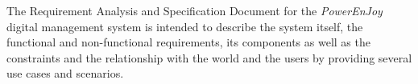 The Requirement Analysis and Specification Document for the \textit{PowerEnJoy} digital management system is intended to describe the system itself, the functional and non-functional requirements, its components as well as the constraints and the relationship with the world and the users by providing several use cases and scenarios. 


